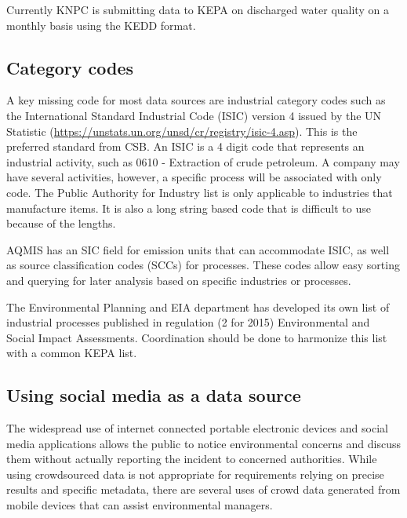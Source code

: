 Currently KNPC is submitting data to KEPA on discharged water quality on a monthly basis using the KEDD format.

\subsection{Category codes}

A key missing code for most data sources are industrial category codes such as the International Standard Industrial Code (ISIC) version 4 issued by the UN Statistic (\url{https://unstats.un.org/unsd/cr/registry/isic-4.asp}). This is the preferred standard from CSB. An ISIC is a 4 digit code that represents an industrial activity, such as 0610 - Extraction of crude petroleum. A company may have several activities, however, a specific process will be associated with only code. The Public Authority for Industry list is only applicable to industries that manufacture items. It is also a long string based code that is difficult to use because of the lengths.

AQMIS has an SIC field for emission units that can accommodate ISIC, as well as source classification codes (SCCs) for processes. These codes allow easy sorting and querying for later analysis based on specific industries or processes.

The Environmental Planning and EIA department has developed its own list of industrial processes published in regulation (2 for 2015) Environmental and Social Impact Assessments. Coordination should be done to harmonize this list with a common KEPA list.

\subsection{Using social media as a data source}

The widespread use of internet connected portable electronic devices and social media applications allows the public to notice environmental concerns and discuss them without actually  reporting the incident to concerned authorities. While using crowdsourced data is not appropriate for requirements relying on precise results and specific metadata, there are several uses of crowd data generated from mobile devices that can assist environmental managers. 

